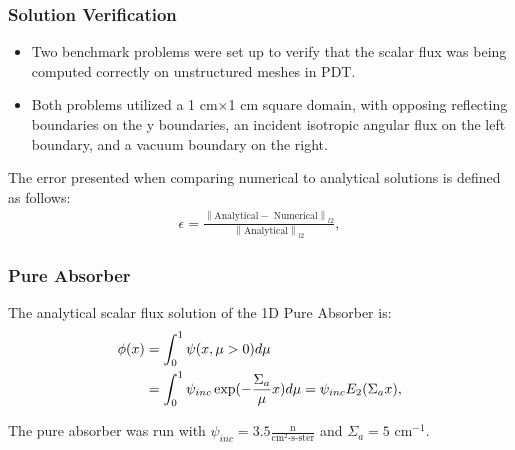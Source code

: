 \documentclass[compress]{beamer}
\newcommand{\norm}[1]{\left\lVert#1\right\rVert}
\begin{document}
\begin{frame}[t]\frametitle{Solution Verification}
\begin{block}{}
\begin{itemize}
\item Two benchmark problems were set up to verify that the scalar flux was being computed correctly on unstructured meshes in PDT.
\item Both problems utilized a 1 cm$\times$1 cm square domain, with opposing reflecting boundaries on the y boundaries, an incident isotropic angular flux on the left boundary, and a vacuum boundary on the right.
\end{itemize}
\end{block}
\begin{block}{}
The error presented when comparing numerical to analytical solutions is defined as follows:
\begin{align*}
\epsilon = \frac{\norm{\text{Analytical} - \text{ Numerical}}_{l2}}{\norm{\text{Analytical}}_{l2}},
\end{align*}
\end{block}
\end{frame}

\begin{frame}[t]\frametitle{Pure Absorber}
\begin{block}{}
The analytical scalar flux solution of the 1D Pure Absorber is:
\begin{align*}
\phi(x) &= \int_{0}^{1}\psi(x,\mu>0) d\mu \notag \\
&= \int_{0}^{1}\psi_{inc}\exp(-\frac{\Sigma_a}{\mu} x) d\mu = \psi_{inc} E_{2}(\Sigma_a x),
\end{align*}
\end{block}
\begin{block}{}
The pure absorber was run with $\psi_{inc} = 3.5 \frac{\text{n}}{\text{cm}^2\text{-s-ster}}$ and $\Sigma_a = 5 \text{ cm}^{-1}$.
\end{block}
\end{frame}
\end{document}

